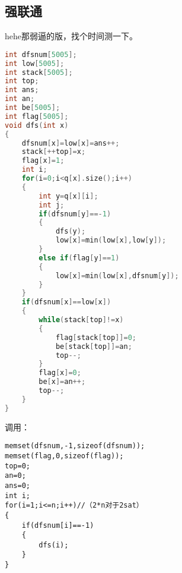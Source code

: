 \subsection{强联通}
    hehe那弱逼的版，找个时间测一下。\\
    \begin{lstlisting}[language=c++]
int dfsnum[5005];
int low[5005];
int stack[5005];
int top;
int ans;
int an;
int be[5005];
int flag[5005];
void dfs(int x)
{
	dfsnum[x]=low[x]=ans++;
	stack[++top]=x;
	flag[x]=1;
	int i;
	for(i=0;i<q[x].size();i++)
	{
		int y=q[x][i];
		int j;
		if(dfsnum[y]==-1)
		{
			dfs(y);
			low[x]=min(low[x],low[y]);
		}
		else if(flag[y]==1)
		{
			low[x]=min(low[x],dfsnum[y]);
		}
	}
	if(dfsnum[x]==low[x])
	{
		while(stack[top]!=x)
		{
			flag[stack[top]]=0;
			be[stack[top]]=an;
			top--;
		}
		flag[x]=0;
		be[x]=an++;
		top--;
	}
}
    \end{lstlisting}
    调用：\\
    \begin{lstlisting}
memset(dfsnum,-1,sizeof(dfsnum));
memset(flag,0,sizeof(flag));
top=0;
an=0;
ans=0;
int i;
for(i=1;i<=n;i++)//（2*n对于2sat）
{
	if(dfsnum[i]==-1)
	{
		dfs(i);
	}
}
    \end{lstlisting}